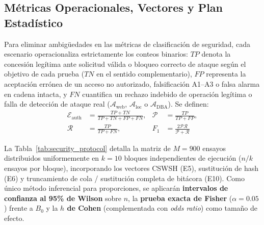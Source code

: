 \documentclass[runningheads,twocolumn]{llncs}
\begin{document}
\subsection{Métricas Operacionales, Vectores y Plan Estadístico}
Para eliminar ambigüedades en las métricas de clasificación de seguridad, cada escenario operacionaliza estrictamente los conteos binarios: $TP$ denota la concesión legítima ante solicitud válida o bloqueo correcto de ataque según el objetivo de cada prueba ($TN$ en el sentido complementario), $FP$ representa la aceptación errónea de un acceso no autorizado, falsificación A1--A3 o falsa alarma en cadena intacta, y $FN$ cuantifica un rechazo indebido de operación legítima o falla de detección de ataque real ($\mathcal{A}_{\text{web}}$, $\mathcal{A}_{\text{loc}}$ o $\mathcal{A}_{\text{DBA}}$). Se definen:
\begin{equation}
\begin{aligned}
    \mathcal{E}_{\text{auth}} &= \frac{TP + TN}{TP + TN + FP + FN}, &
    \mathcal{P} &= \frac{TP}{TP + FP}, \\[4pt]
    \mathcal{R} &= \frac{TP}{TP + FN}, &
    F_1 &= \frac{2\mathcal{P}\mathcal{R}}{\mathcal{P}+\mathcal{R}}
\end{aligned}
\label{eq:metrics}
\end{equation}

La Tabla~\ref{tab:security_protocol} detalla la matriz de $M = 900$ ensayos distribuidos uniformemente en $k = 10$ bloques independientes de ejecución ($n/k$ ensayos por bloque), incorporando los vectores CSWSH (E5), sustitución de hash (E6) y truncamiento de cola / sustitución completa de bitácora (E10). Como único método inferencial para proporciones, se aplicarán \textbf{intervalos de confianza al 95\% de Wilson} sobre $n$, la \textbf{prueba exacta de Fisher} ($\alpha = 0.05$) frente a $B_0$ y la \textbf{$h$ de Cohen} (complementada con \textit{odds ratio}) como tamaño de efecto.
\end{document}
